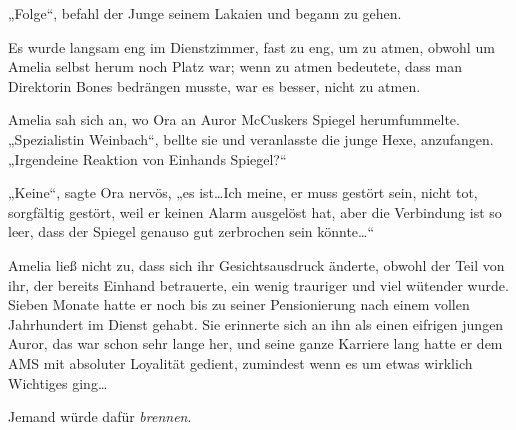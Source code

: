 „Folge“, befahl der Junge seinem Lakaien und begann zu gehen.

\later

Es wurde langsam eng im Dienstzimmer, fast zu eng, um zu atmen, obwohl um Amelia selbst herum noch Platz war; wenn zu atmen bedeutete, dass man Direktorin Bones bedrängen musste, war es besser, nicht zu atmen.

Amelia sah sich an, wo Ora an Auror McCuskers Spiegel herumfummelte. „Spezialistin Weinbach“, bellte sie und veranlasste die junge Hexe, anzufangen. „Irgendeine Reaktion von Einhands Spiegel?“

„Keine“, sagte Ora nervös, „es ist…Ich meine, er muss gestört sein, nicht tot, sorgfältig gestört, weil er keinen Alarm ausgelöst hat, aber die Verbindung ist so leer, dass der Spiegel genauso gut zerbrochen sein könnte…“

Amelia ließ nicht zu, dass sich ihr Gesichtsausdruck änderte, obwohl der Teil von ihr, der bereits Einhand betrauerte, ein wenig trauriger und viel wütender wurde. Sieben Monate hatte er noch bis zu seiner Pensionierung nach einem vollen Jahrhundert im Dienst gehabt. Sie erinnerte sich an ihn als einen eifrigen jungen Auror, das war schon sehr lange her, und seine ganze Karriere lang hatte er dem AMS mit absoluter Loyalität gedient, zumindest wenn es um etwas wirklich Wichtiges ging…

Jemand würde dafür \emph{brennen}.

